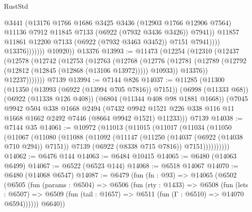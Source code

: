 \begin{lexlean}{RustStd}
\begin{coremodule}
                                @3441
                                (@13176
                                  @1766
                                  @1686
                                  @3425
                                  @3436
                                  (@12903 @1766 @12906 @7564)
                                  @11136
                                  @7912
                                  @11845
                                  @7133
                                  (@6922 (@7932 @3436 @3426))
                                  @7941))
                              @11857
                              @11861
                              @12200
                              @7133
                              (@6922 (@7932 @3463 @3452))
                              @7151
                              @7941))))
                      @13376)))))))
        @10920))
    @13376
@13993 := @11473
    (@12254
      (@12310
        (@12437
          (@12578
            (@12742
              (@12753
                (@12763
                  (@12768
                    (@12776
                      (@12781 (@12789 (@12792 (@12812 (@12845 (@12868 (@13106 @13972))))) @10933))
                      @13376))
                  @12237)))))))
    @7139
@13994 := @7144 @826
@14037 := @11285
    (@11300
      (@11350 (@13993 (@6922 (@13994 @705 @7816)) @7151))
      (@6998 (@11333 @68))
      (@6922 (@11338 @126 @408))
      (@6804 (@11344 @408 @98 @1881 @1668))
      (@7045
        @9942
        @504
        @338
        @1668
        @2494
        (@7432 @9942 @1521 @226 @338 @116 @11 @1668 @1662 @2492 @7446 (@8664 @9942 @1521) @11233)))
    @7139
@14038 := @7144 @35
@14061 := @10972
    (@11013
      (@11015
        (@11017
          (@11034
            (@11050
              (@11067
                (@11080
                  (@11088
                    (@11092
                      (@11147
                        (@11250 (@14037 (@6922 (@14038 @710 @294)) @7151))
                        @7139
                        (@6922 (@8338 @715 @7816))
                        @7151))))))))))
@14062 := @6476 @144
@14063 := @6484 @10415
@14065 := @6480 (@14063 @6499)
@14067 := @6522 (@6523 @144)
@14068 := @6518 @14067
@14070 := @6480 (@14068 @6547)
@14087 := @6479
    (fun (fn : @93) =>
    @14065
      (@6502
        (@6505
          (fun (params : @6504) =>
          @6506
            (fun (rty : @1433) =>
            @6508
              (fun (lets : @6507) =>
              @6509 (fun (tail : @1657) => @6511 (fun (Γ : @6510) => @14070 @6594))))))
        @6640))

\end{coremodule}
\end{lexlean}
